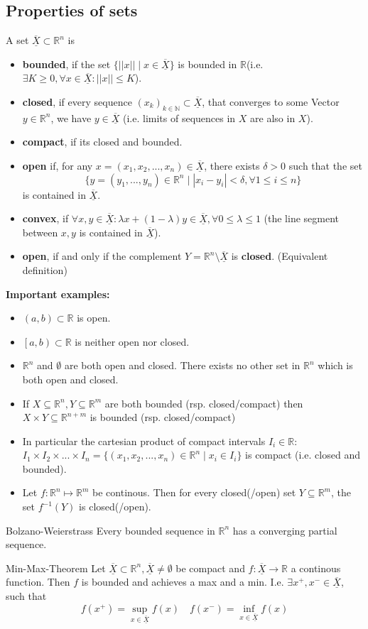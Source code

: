\documentclass[a4paper,fontsize = 10pt]{article}
\def\R{\mathbb{R}}
\def\N{\mathbb{N}}
\def\X{\underline{\overline{X}}}
\begin{document}
\subsection{Properties of sets}
A set \(\X \subset \R^n \) is
\begin{itemize}
  \item \textbf{bounded}, if the set \(\{ ||x|| \mid x \in \X \}\) is bounded in \(\R\)(i.e. \(\exists K \ge 0, \forall x \in \X: ||x|| \le K\)).
  \item \textbf{closed}, if every sequence \((x_k)_{k\in \N} \subset \X\), that converges to some Vector \(y \in \R^n\), we have \(y \in \X\) (i.e. limits of sequences in $X$ are also in $X$).
  \item \textbf{compact}, if its closed and bounded.
  \item \textbf{open} if, for any $x =(x_1,x_2,...,x_n) \in \X$, there exists $\delta >0$ such that the set \[\{y = (y_1,...,y_n) \in \R^n \mid |x_i-y_i|< \delta, \forall 1 \leq i \leq n\}\] is contained in $\X$.
  \item \textbf{convex}, if \(\forall x, y \in \X: \lambda x + (1 - \lambda)y \in \X, \forall 0 \leq \lambda \leq 1\) (the line segment between \(x, y\) is contained in \(\X\)).
  \item \textbf{open}, if and only if the complement $Y = \R^n \setminus \X$ is \textbf{closed}. (Equivalent definition)
\end{itemize}
\textbf{Important examples:}
\begin{itemize}
  \item \((a,b) \subset \R\) is open.
  \item \(\left[a,b\right) \subset \R\) is neither open nor closed.
  \item \(\R^n\) and \(\emptyset\) are both open and closed. There exists no other set in $\R^n$ which is both open and closed.
  \item If $X \subseteq \R^n, Y \subseteq \R^m$ are both bounded (rsp. closed/compact) then $X \times Y \subseteq \R^{n+m}$ is bounded (rsp. closed/compact)
  \item In particular the cartesian product of compact intervals $I_i \in \R$: $I_1 \times I_2 \times ... \times I_n = \{(x_1,x_2,...,x_n) \in \R^n \mid x_i \in I_i\}$ is compact (i.e. closed and bounded).
  \item Let $f: \R^n \mapsto \R^m$ be continous. Then for every closed(/open) set $Y \subseteq \R^m$, the set $f^{-1}(Y)$ is closed(/open). 
\end{itemize}
\begin{subbox}{Bolzano-Weierstrass}
  Every bounded sequence in \(\R^n\) has a converging partial sequence.
\end{subbox}
\begin{subbox}{Min-Max-Theorem}
  Let \(\X \subset \R^n, \X \ne \emptyset\) be compact and \(f: \X \to \R\) a continous function. Then \(f\) is bounded and achieves a max and a min. I.e. $\exists x^+,x^- \in \X$, such that
  \[f(x^+) = \sup_{x\in \X} f(x) \quad f(x^-) = \inf_{x \in \X} f(x)\]
\end{subbox}
\end{document}
